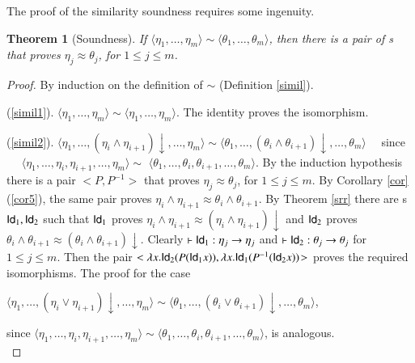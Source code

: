 \documentclass[UKenglish]{eptcs}
\newtheorem{theorem}[fact]{Theorem}
\newcommand{\fhp}{\text{\small FHP}}   \newcommand{\fhi}{\text{\small FHI}}   \newcommand{\CC}{\mathcal{C}}
\newcommand{\tQ}{\eta}
\newcommand{\tY}{\theta}
\newcommand{\seq}[2]{\langle#1,\ldots,#2\rangle}
\newcommand{\tsi}{\sim}
\newcommand{\iso}{\approx}
\newcommand{\id}{{\sf Id}}
\newcommand{\labelx}[1]{\label{#1}}
\newcommand{\nf}[1]{#1\!\!\downarrow}
\begin{document}
\smallskip

The proof of the similarity soundness requires some ingenuity.
\begin{theorem}[Soundness]\labelx{ParteVera} If $\seq{\tQ_1}{\tQ_m}\tsi \seq{\tY_1}{\tY_m}$, then
there is a pair of \fhp s that proves $\tQ_j\iso\tY_j$, for
$1\leq j\leq m$.
\end{theorem}
\begin{proof}
By induction on the definition of
$\tsi$ (Definition \ref{simil}). 

(\ref{simil1}). $\seq{\tQ_1}{\tQ_m}\tsi \seq{\tQ_1}{\tQ_m}$. The identity proves the isomorphism.

(\ref{simil2}).
$\langle{\tQ_1},\ldots,\nf{(\tQ_i\wedge\tQ_{i+1})},\ldots,{\tQ_m}\rangle\tsi \langle{\tY_1},\ldots,\nf{(\tY_i\wedge\tY_{i+1})},\ldots,{\tY_m}\rangle$~~ since ~~
$\langle{\tQ_1},\ldots,\tQ_i,\tQ_{i+1},\ldots,{\tQ_m}\rangle\tsi $ $ \langle{\tY_1},\ldots,\tY_i,\tY_{i+1},\ldots,{\tY_m}\rangle$.
By the
induction hypothesis there is a pair $<P, P^{-1}\!\!>$ that proves $\tQ_{j}\iso\tY_{j}$, for
$1\leq j\leq m$. By Corollary \ref{cor}(\ref{cor5}), the same pair proves $\tQ_i\wedge\tQ_{i+1}\iso\tY_i\wedge\tY_{i+1}$. By Theorem \ref{srr} there are \fhi s $\id_1,\id_2$ such that
$\id_1$ proves $\tQ_i\wedge\tQ_{i+1}\iso\nf{(\tQ_i\wedge\tQ_{i+1})}$ and $\id_2$ proves $\tY_i\wedge\tY_{i+1}\iso\nf{(\tY_i\wedge\tY_{i+1})}$. Clearly \mbox{$\vdash\id_1:\tQ_j\to\tQ_j$} and $\vdash\id_2:\tY_j\to\tY_j$ for $1\leq j\leq m$.
Then the pair \mbox{$<\lambda x.\id_2(P(\id_1x)), \lambda x.\id_1(P^{-1}(\id_2x))\!>$} proves the required isomorphisms.
The proof for the case\\ \centerline{$\langle{\tQ_1},\ldots,\nf{(\tQ_i\vee\tQ_{i+1})},\ldots,{\tQ_m}\rangle\tsi \langle{\tY_1},\ldots,\nf{(\tY_i\vee\tY_{i+1})},\ldots,{\tY_m}\rangle$,} since
$\langle{\tQ_1},\ldots,\tQ_i,\tQ_{i+1},\ldots,{\tQ_m}\rangle\tsi \langle{\tY_1},\ldots,\tY_i,\tY_{i+1},\ldots,{\tY_m}\rangle$, is analogous.\\


\end{proof}
\end{document}

